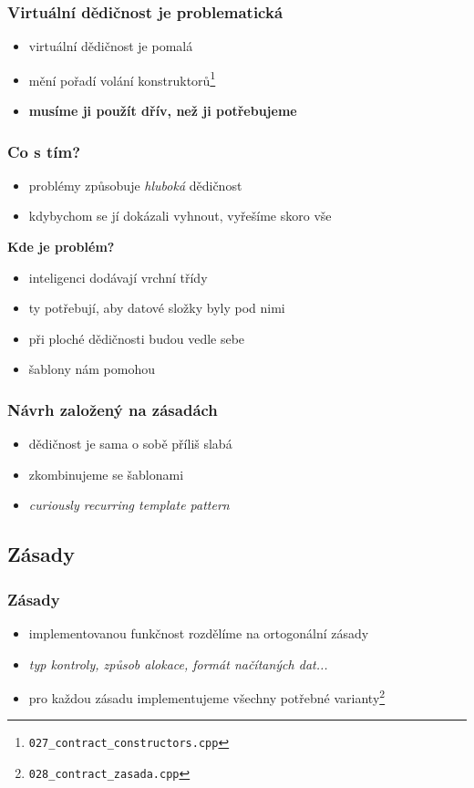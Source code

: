 	\begin{frame}
		\frametitle{Virtuální dědičnost je problematická}
		\begin{itemize}
			\item{virtuální dědičnost je pomalá}
			\item{mění pořadí volání konstruktorů\footnote{\texttt{027\_contract\_constructors.cpp}}}
			\item{\textbf{musíme ji použít dřív, než ji potřebujeme}}
		\end{itemize}
	\end{frame}

	\begin{frame}
		\frametitle{Co s tím?}
		\begin{itemize}
			\item{problémy způsobuje \textit{hluboká} dědičnost}
			\item{kdybychom se jí dokázali vyhnout, vyřešíme skoro vše}
		\end{itemize}\pause
		\textbf{Kde je problém?}
		\begin{itemize}
			\item{inteligenci dodávají vrchní třídy}
			\item{ty potřebují, aby datové složky byly pod nimi}
			\item{při ploché dědičnosti budou vedle sebe}
			\item{šablony nám pomohou}
		\end{itemize}
	\end{frame}

	\begin{frame}
		\frametitle{Návrh založený na zásadách}
		\begin{itemize}
			\item{dědičnost je sama o sobě příliš slabá}
			\item{zkombinujeme se šablonami}
			\item{\textit{curiously recurring template pattern}}
		\end{itemize}
	\end{frame}

	\subsection{Zásady}

	\begin{frame}
		\frametitle{Zásady}
		\begin{itemize}
			\item{implementovanou funkčnost rozdělíme na ortogonální zásady}
			\item{\textit{typ kontroly, způsob alokace, formát načítaných dat...}}
			\item{pro každou zásadu implementujeme všechny potřebné varianty\footnote{\texttt{028\_contract\_zasada.cpp}}}
		\end{itemize}
	\end{frame}

